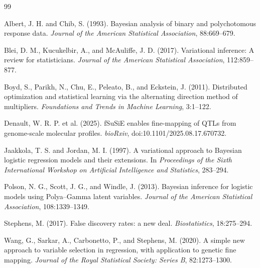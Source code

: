\documentclass[11pt]{article}
\begin{document}
\begin{thebibliography}{99}

Albert, J. H. and Chib, S. (1993).
Bayesian analysis of binary and polychotomous response data.
\emph{Journal of the American Statistical Association}, 88:669--679.

Blei, D. M., Kucukelbir, A., and McAuliffe, J. D. (2017).
Variational inference: A review for statisticians.
\emph{Journal of the American Statistical Association}, 112:859--877.

Boyd, S., Parikh, N., Chu, E., Peleato, B., and Eckstein, J. (2011).
Distributed optimization and statistical learning via the alternating
direction method of multipliers.
\emph{Foundations and Trends in Machine Learning}, 3:1--122.

Denault, W. R. P. et al. (2025).
fSuSiE enables fine-mapping of QTLs from genome-scale molecular profiles.
\emph{bioRxiv}, doi:10.1101/2025.08.17.670732.

Jaakkola, T. S. and Jordan, M. I. (1997).
A variational approach to Bayesian logistic regression models and their
extensions.
In \emph{Proceedings of the Sixth International Workshop on Artificial
Intelligence and Statistics}, 283--294.

Polson, N. G., Scott, J. G., and Windle, J. (2013).
Bayesian inference for logistic models using Polya--Gamma latent variables.
\emph{Journal of the American Statistical Association}, 108:1339--1349.

Stephens, M. (2017).
False discovery rates: a new deal.
\emph{Biostatistics}, 18:275--294.

Wang, G., Sarkar, A., Carbonetto, P., and Stephens, M. (2020).
A simple new approach to variable selection in regression, with application
to genetic fine mapping.
\emph{Journal of the Royal Statistical Society: Series B}, 82:1273--1300.

\end{thebibliography}
\end{document}

